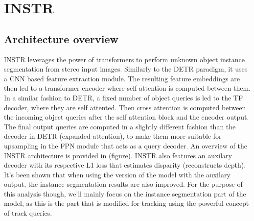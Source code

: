 

\chapter{INSTR}\label{chapter:INSTR}


\section{Architecture overview}

INSTR leverages the power of transformers to perform unknown object instance segmentation from stereo input images. Similarly to the DETR paradigm, it uses a CNN based feature extraction module. The resulting feature embeddings are then led to a transformer encoder where self attention is computed between them. In a similar fashion to DETR, a fixed number of object queries is led to the TF decoder, where they are self attented. Then cross attention is computed between the incoming object queries after the self attention block and the encoder output. The final output queries are computed in a slightly different fashion than the decoder in DETR (expanded attention), to make them more suitable for upsampling in the FPN module that acts as a query decoder. An overview of the INSTR architecture is provided in (figure). INSTR also features an auxilary decoder with its respective L1 loss that estimates disparity (reconstructs depth). It's been shown that when using the version of the model with the auxilary output, the instance segmentation results are also improved. For the purpose of this analysis though, we'll mainly focus on the instance segmentation part of the model, as this is the part that is modified for tracking using the powerful concept of track queries.

